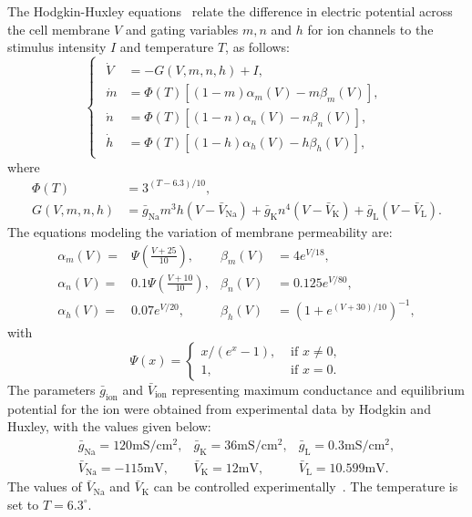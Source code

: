 The Hodgkin-Huxley equations~\cite{HodgkinHuxley1952} relate the difference in electric
potential across the cell membrane $V$ and gating variables $m, n$ and $h$
for ion channels to the stimulus intensity $I$ and temperature $T$, as
follows:
\begin{equation}
\label{eq:HodgkinHuxleyEquations}
\begin{cases}
\begin{aligned}
    \dot{V} &= -G(V, m, n, h)+I, \\
    \dot{m} &= \Phi(T)\left[(1-m) \alpha_{m}(V)-m \beta_{m}(V)\right], \\
    \dot{n} &= \Phi(T)\left[(1-n) \alpha_{n}(V)-n \beta_{n}(V)\right], \\
    \dot{h} &= \Phi(T)\left[(1-h) \alpha_{h}(V)-h \beta_{h}(V)\right],
\end{aligned}
\end{cases}
\end{equation}
where 
\begin{align*}
    \Phi(T) & = 3^{({T}-6.3) / 10}, \\
    G(V, m, n, h) & =\bar{g}_{\mathrm{Na}} m^{3}
    h\left(V-\bar{V}_{\mathrm{Na}}\right)+\bar{g}_{\mathrm{K}}
    n^{4}\left(V-\bar{V}_{\mathrm{K}}\right)+\bar{g}_{\mathrm{L}}\left(V-\bar{V}_{\mathrm{L}}\right).
\end{align*}
The equations modeling the variation of membrane permeability are:
\begin{align*}
    \alpha_{m}(V) =& \Psi\left(\frac{V+25}{10}\right), & \beta_{m}(V) &= 4 e^{V / 18}, \\
    \alpha_{n}(V) =& 0.1 \Psi\left(\frac{V+10}{10}\right), & \beta_{n}(V) &= 0.125 e^{V / 80}, \\
    \alpha_{h}(V) =& 0.07 e^{V / 20}, & \beta_{h}(V) &= \left(1+e^{(V+30) / 10}\right)^{-1},
\end{align*} with
\begin{equation*}
    \Psi(x) = \begin{cases}
        x /\left(e^{x}-1\right), & \text { if } x \neq 0, \\
        1, & \text { if } x=0.
    \end{cases}
\end{equation*}
The parameters $\bar{g}_{\text{ion}}$ and $\bar{V}_{\text{ion}}$ representing
maximum conductance and equilibrium potential for the ion were obtained from
experimental data by Hodgkin and Huxley, with the values given below:
\[
\begin{array}{lll}
\bar{g}_{\mathrm{Na}}=120 \mathrm{mS} / \mathrm{cm}^{2}, 
& \bar{g}_{\mathrm{K}}=36 \mathrm{mS} / \mathrm{cm}^{2}, 
& \bar{g}_{\mathrm{L}}=0.3 \mathrm{mS} / \mathrm{cm}^{2}, \\
\bar{V}_{\mathrm{Na}}=-115 \mathrm{mV},
& \bar{V}_{\mathrm{K}}=12 \mathrm{mV}, 
& \bar{V}_{\mathrm{L}}=10.599 \mathrm{mV}.
\end{array}
\]
The values of $\bar{V}_{\mathrm{Na}}$ and $\bar{V}_{\mathrm{K}}$ can be
controlled experimentally~\cite{HodgkinHuxley1952a,Jack1975ElectricCurrentFlow}.
The temperature is set to $T=6.3^{\circ}$.

